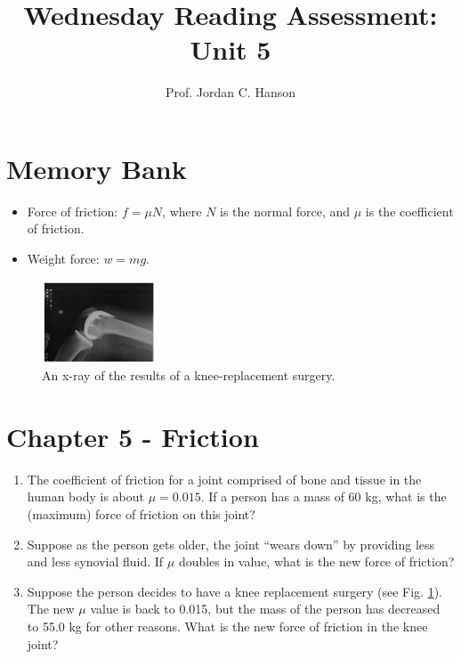 \documentclass{article}
\begin{document}
\title{Wednesday Reading Assessment: Unit 5}
\author{Prof. Jordan C. Hanson}

\maketitle

\section{Memory Bank}

\begin{itemize}
\item Force of friction: $f = \mu N$, where $N$ is the normal force, and $\mu$ is the coefficient of friction.
\item Weight force: $w = mg$.
\end{itemize}
\begin{figure}[ht]
\centering
\includegraphics[width=0.3\textwidth]{bone.png}
\caption{\label{fig:bone} An x-ray of the results of a knee-replacement surgery.}
\end{figure}
\section{Chapter 5 - Friction}
\begin{enumerate}
\item The coefficient of friction for a joint comprised of bone and tissue in the human body is about $\mu = 0.015$.  If a person has a mass of 60 kg, what is the (maximum) force of friction on this joint? \\ \vspace{2cm}
\item Suppose as the person gets older, the joint ``wears down'' by providing less and less synovial fluid.  If $\mu$ doubles in value, what is the new force of friction? \\ \vspace{2cm}
\item Suppose the person decides to have a knee replacement surgery (see Fig. \ref{fig:bone}).  The new $\mu$ value is back to 0.015, but the mass of the person has decreased to 55.0 kg for other reasons.  What is the new force of friction in the knee joint?
\end{enumerate}
\end{document}
